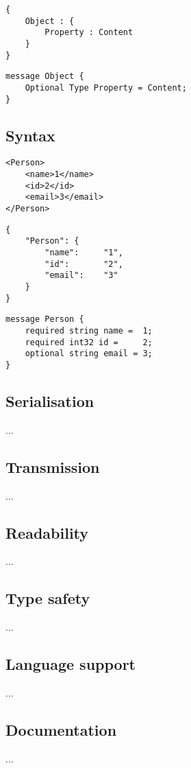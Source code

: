 \documentclass[../report.tex]{subfiles}
\begin{document}
\vspace{1mm}

\begin{Verbatim}[frame=single,numbers=right,framesep=5mm,label=JSON Object]
{
    Object : {
        Property : Content
    }
}
\end{Verbatim}

\vspace{1mm}

\begin{Verbatim}[frame=single,numbers=right,framesep=5mm,label=Proto Object]
message Object {
    Optional Type Property = Content;
}
\end{Verbatim}

\subsection{Syntax}

\begin{Verbatim}[frame=single,numbers=right,framesep=5mm,label=XML Object]
<Person>
    <name>1</name>
    <id>2</id>
    <email>3</email>
</Person>
\end{Verbatim}

\vspace{1mm}

\begin{Verbatim}[frame=single,numbers=right,framesep=5mm,label=JSON Object]
{
    "Person": {
        "name":     "1",
        "id":       "2",
        "email":    "3"
    }
}
\end{Verbatim}

\vspace{1mm}

\begin{Verbatim}[frame=single,numbers=right,framesep=5mm,label=Proto Object]
message Person {
    required string name =  1;
    required int32 id =     2;
    optional string email = 3;
}
\end{Verbatim}

\subsection{Serialisation}

...

\subsection{Transmission}

...

\subsection{Readability}

...

\subsection{Type safety}

...

\subsection{Language support}

...

\subsection{Documentation}

...
\end{document}

